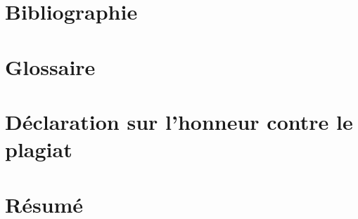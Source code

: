 \documentclass[11pt]{article}
\begin{document}
\section*{Bibliographie}
\newpage

\section*{Glossaire}

\section*{Déclaration sur l'honneur contre le plagiat}

\newpage

\newpage
\section*{Résumé}
\end{document}
